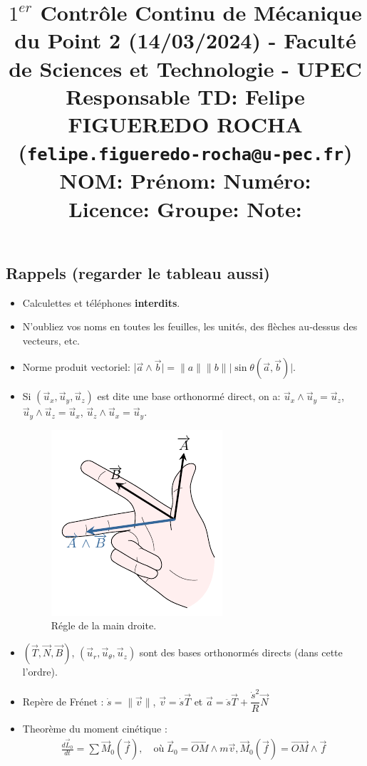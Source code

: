 \documentclass[french,10pt,twocolumn]{article}
\title{\vspace{-1cm} \large $1^{er}$ Contrôle Continu de Mécanique du Point 2 (14/03/2024) - 	Faculté de Sciences et Technologie - UPEC \\ 	Responsable TD: Felipe FIGUEREDO ROCHA (\texttt{felipe.figueredo-rocha@u-pec.fr}) \\
	NOM:\underline{\hspace{7cm}} Prénom: \underline{\hspace{5cm}}  Numéro: \underline{\hspace{2cm}} \\
	Licence:\underline{\hspace{7cm}} Groupe: \underline{\hspace{5cm}} Note: \underline{\hspace{1.5cm}}
	\vspace{-2cm}}
\author{}
\date{}
\begin{document}
	\maketitle
	
	\vspace{-0.5cm}
	\subsection*{Rappels (regarder le tableau aussi)}
	\begin{itemize}
		\item Calculettes et téléphones \textbf{interdits}.
		\item N'oubliez vos noms en toutes les feuilles, les unités, des flèches au-dessus des vecteurs, etc.
		\item Norme produit vectoriel: |$\vec{a} \wedge \vec{b}| =  \|a\| \|b\| |\sin{\theta}(\vec{a}, \vec{b})|$.
		\item Si $(\vec{u}_x, \vec{u}_y, \vec{u}_z)$ est dite une base orthonormé direct, on a: $\vec{u}_x \wedge \vec{u}_y = \vec{u}_z$, $\vec{u}_y \wedge \vec{u}_z = \vec{u}_x$, $\vec{u}_z \wedge \vec{u}_x = \vec{u}_y$.
		\vspace{-0.5cm}
		\begin{figure}[h!]
			\centering
			\includegraphics[width=0.3\linewidth]{regle_de_la_main_droite}
			\caption{Régle de la main droite.}
			\label{fig:regledelamaindroite}
		\end{figure}
		\vspace{-0.5cm}
		\item $(\vec{T},\vec{N},\vec{B})$, $(\vec{u}_r,\vec{u}_{\theta},\vec{u}_z)$ sont des bases orthonormés directs (dans cette l'ordre).
		\item Repère de Frénet : $\dot{s} = \|\vec{v}\|$, $\vec{v} = \dot{s} \vec{T}$ et 
		$\vec{a} = \ddot{s} \vec{T} + \dfrac{\dot{s}^2}{R} \vec{N}$
		\item Theorème du moment cinétique :
		\begin{align*}
			\frac{d \vec{L}_0}{d t} = \sum \vec{M}_0(\vec{f}), \quad \text{où} \; \vec{L}_0 = \vec{OM}\wedge m\vec{v}, \vec{M}_0(\vec{f}) = \vec{OM}\wedge \vec{f}
		\end{align*}
	\end{itemize}
	
\end{document}
